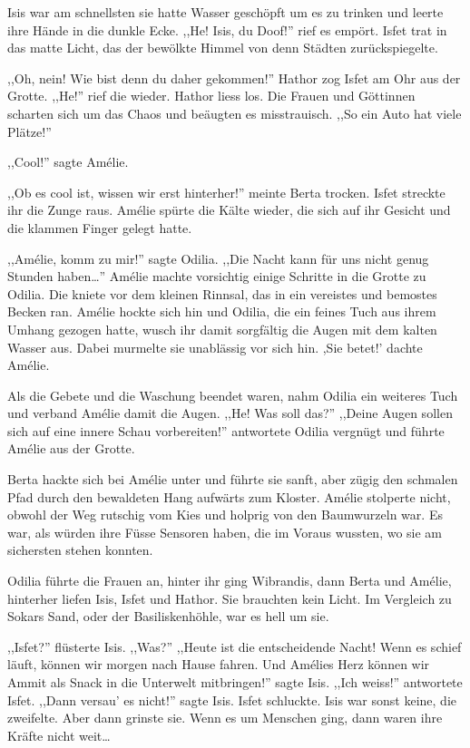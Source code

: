 \documentclass[11pt,titlepage,a5paper]{book}
\begin{document}
Isis war am schnellsten sie hatte Wasser geschöpft um es zu trinken und leerte ihre Hände in die dunkle Ecke. ,,He! Isis, du Doof!'' rief es empört. Isfet trat in das matte Licht, das der bewölkte Himmel von denn Städten zurückspiegelte.

,,Oh, nein! Wie bist denn du daher gekommen!'' Hathor zog Isfet am Ohr aus der Grotte. ,,He!'' rief die wieder. Hathor liess los. Die Frauen und Göttinnen scharten sich um das Chaos und beäugten es misstrauisch. ,,So ein Auto hat viele Plätze!''

,,Cool!'' sagte Amélie.

,,Ob es cool ist, wissen wir erst hinterher!'' meinte Berta trocken. Isfet streckte ihr die Zunge raus. Amélie spürte die Kälte wieder, die sich auf ihr Gesicht und die klammen Finger gelegt hatte.

,,Amélie, komm zu mir!'' sagte Odilia. ,,Die Nacht kann für uns nicht genug Stunden haben\dots '' Amélie machte vorsichtig einige Schritte in die Grotte zu Odilia. Die kniete vor dem kleinen Rinnsal, das in ein vereistes und bemostes Becken ran. Amélie hockte sich hin und Odilia, die ein feines Tuch aus ihrem Umhang gezogen hatte, wusch ihr damit sorgfältig die Augen mit dem kalten Wasser aus. Dabei murmelte sie unablässig vor sich hin. ,Sie betet!' dachte Amélie.

Als die Gebete und die Waschung beendet waren, nahm Odilia ein weiteres Tuch und verband Amélie damit die Augen. ,,He! Was soll das?'' ,,Deine Augen sollen sich auf eine innere Schau vorbereiten!'' antwortete Odilia vergnügt und führte Amélie aus der Grotte.

Berta hackte sich bei Amélie unter und führte sie sanft, aber zügig den schmalen Pfad durch den bewaldeten Hang aufwärts zum Kloster. Amélie stolperte nicht, obwohl der Weg rutschig vom Kies und holprig von den Baumwurzeln war. Es war, als würden ihre Füsse Sensoren haben, die im Voraus wussten, wo sie am sichersten stehen konnten.

Odilia führte die Frauen an, hinter ihr ging Wibrandis, dann Berta und Amélie, hinterher liefen Isis, Isfet und Hathor. Sie brauchten kein Licht. Im Vergleich zu Sokars Sand, oder der Basiliskenhöhle, war es hell um sie.

,,Isfet?'' flüsterte Isis. ,,Was?'' ,,Heute ist die entscheidende Nacht! Wenn es schief läuft, können wir morgen nach Hause fahren. Und Amélies Herz können wir Ammit als Snack in die Unterwelt mitbringen!'' sagte Isis. ,,Ich weiss!'' antwortete Isfet. ,,Dann versau' es nicht!'' sagte Isis. Isfet schluckte. Isis war sonst keine, die zweifelte. Aber dann grinste sie. Wenn es um Menschen ging, dann waren ihre Kräfte nicht weit\dots
\end{document}
